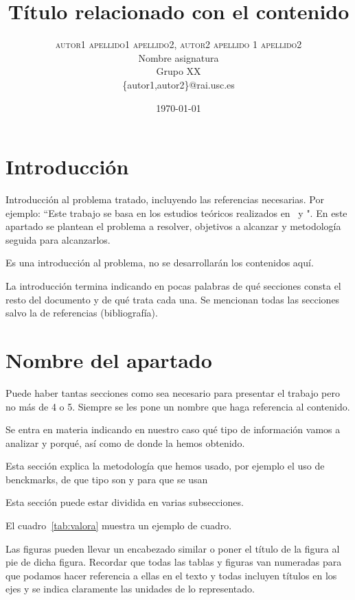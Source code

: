 \documentclass[a4paper,twocolumn]{article}
\title{Título relacionado con el contenido} %
\author{%
	\textsc{autor1 apellido1 apellido2, autor2 apellido 1 apellido2} \\[1ex] %
	\normalsize Nombre asignatura\\
	\normalsize Grupo XX \\ %
	\normalsize \{autor1,autor2\}@rai.usc.es %
}
\date{\today} %
\begin{document}
	
\maketitle


\section{Introducción}

Introducción al problema tratado, incluyendo las referencias  necesarias. Por ejemplo: ``Este trabajo se basa en los estudios teóricos realizados en~\cite{Intel:2005} y \cite{spec}". En este apartado se plantean el problema a resolver, objetivos a alcanzar y metodología seguida para alcanzarlos.

Es una introducción al problema, no se desarrollarán los contenidos aquí. 

La introducción termina indicando en pocas palabras de qué secciones consta el resto del documento y de qué trata cada una. Se mencionan todas las secciones salvo la de referencias (bibliografía). 


\section{Nombre del apartado}
Puede haber tantas secciones como sea necesario para presentar el trabajo pero no más de 4 o 5. Siempre se les pone un nombre que haga referencia al contenido. 

Se entra en materia indicando en nuestro caso qué tipo de información vamos a analizar y porqué, así como de donde la hemos obtenido. 

Esta sección explica la metodología que hemos usado, por ejemplo el uso de benckmarks, de que tipo son y para que se usan

Esta sección puede estar dividida en varias subsecciones. 

El cuadro~\ref{tab:valora} muestra un ejemplo de cuadro.

Las figuras pueden llevar un encabezado similar o poner el título de la figura al pie de dicha figura. Recordar que todas las tablas y figuras van numeradas para que podamos hacer referencia a ellas en el texto y todas incluyen títulos en los ejes y se indica claramente las unidades de lo representado.
\end{document}
